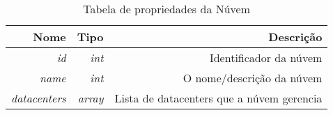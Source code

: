 \begin{table}[!htb]
    \centering
    \caption[Representação da Cloud]{Tabela de propriedades da Núvem
    \label{tab:cloud-shape}}
    \begin{tabular}{rrr}
        \toprule
            Nome & Tipo & Descrição \\ 
        \midrule
            \textit{id} & \textit{int} & Identificador da núvem \\
            \textit{name} & \textit{int} & O nome/descrição da núvem \\
            \textit{datacenters} & \textit{array} & Lista de datacenters que a núvem gerencia \\
        \bottomrule
    \end{tabular}
\end{table}


